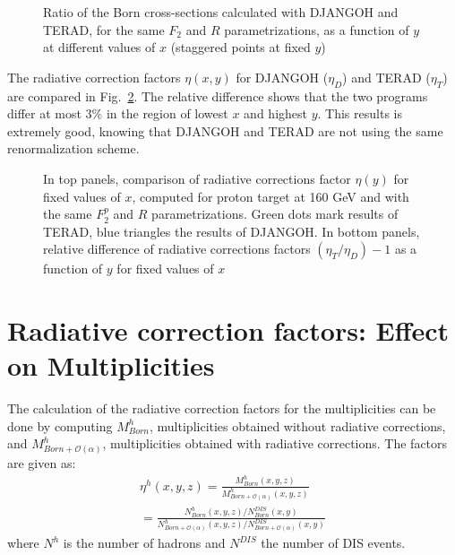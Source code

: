 \begin{figure}[!htb]
\centerline{}
\caption{Ratio of the Born cross-sections calculated with DJANGOH and TERAD, for the same $F_2$ and $R$ parametrizations, as a function of $y$ at different values of $x$ (staggered points at fixed $y$)}\label{fig:BRy}
\end{figure}

The radiative correction factors $\eta(x,y)$ for DJANGOH ($\eta_D$) and TERAD ($\eta_T$) are compared in Fig.~\ref{fig:RCy}. The relative difference shows that the two programs differ at most $3$\% in the region of lowest $x$ and highest $y$. This results is extremely good, knowing that DJANGOH and TERAD are not using the same renormalization scheme.


\begin{figure}[htb]
\centerline{}
\caption{In top panels, comparison of radiative corrections factor $\eta(y)$ for fixed values of $x$, computed for proton target at 160 GeV and with the same $F^p_2$ and $R$ parametrizations. Green dots mark results of TERAD, blue triangles the results of DJANGOH. In bottom panels, relative difference of radiative corrections factors $(\eta_T/\eta_D)-1$ as a function of $y$ for fixed values of $x$}\label{fig:RCy}
\end{figure}



\section{Radiative correction factors: Effect on Multiplicities}\label{sec:RCFMult}

The calculation of the radiative correction factors for the multiplicities can be done by computing $M^{h}_{Born}$, multiplicities obtained without radiative corrections, and $M^{h}_{Born+\mathscr{O}(\alpha)}$, multiplicities obtained with radiative corrections. The factors are given as:
%
\begin{equation}
  \begin{split}
    \eta^{h}(x,y,z)=\frac{M^{h}_{Born}(x,y,z)}{M^{h}_{Born+\mathscr{O}(\alpha)}(x,y,z)} \\
     = \frac{N^{h}_{Born}(x,y,z)/N^{DIS}_{Born}(x,y)}{N^{h}_{Born+\mathscr{O}(\alpha)}(x,y,z)/N^{DIS}_{Born+\mathscr{O}(\alpha)}(x,y)}
  \end{split}
\end{equation}
%
where $N^h$ is the number of hadrons and $N^{DIS}$ the number of DIS events.

